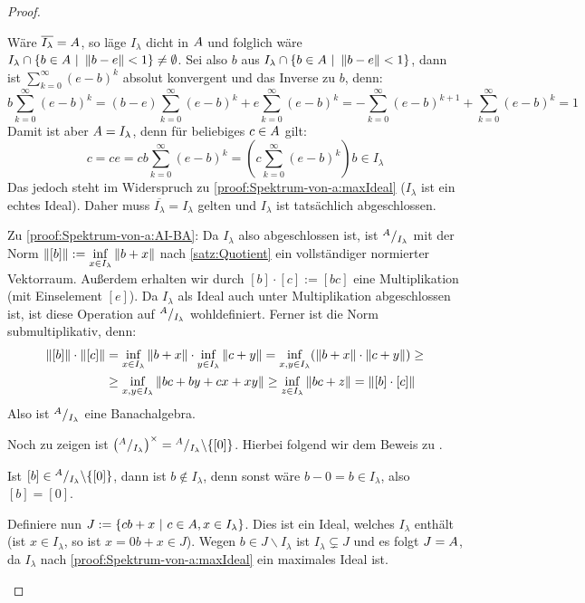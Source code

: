 \begin{proof}
\begin{itemize}
Wäre $\overline{I_\lambda} = A$, so läge $I_\lambda$ dicht in $A$ und folglich wäre $I_\lambda \cap \{b \in A ~|~ \left\lVert b-e\right\rVert < 1\} \neq \emptyset$. Sei also $b$ aus $I_\lambda \cap \{b \in A ~|~ \left\lVert b-e\right\rVert < 1\}$, dann ist $\sum_{k=0}^\infty(e-b)^k$ absolut konvergent und das Inverse zu $b$, denn:
	\[b\sum_{k=0}^\infty(e-b)^k = (b-e)\sum_{k=0}^\infty(e-b)^k + e\sum_{k=0}^\infty(e-b)^k = -\sum_{k=0}^\infty(e-b)^{k+1} +\sum_{k=0}^\infty(e-b)^k = 1\]
Damit ist aber $A = I_\lambda$, denn für beliebiges $c \in A$ gilt:
	\[c = ce = cb\sum_{k=0}^\infty(e-b)^k = \left(c\sum_{k=0}^\infty(e-b)^k\right) b \in I_\lambda\]
Das jedoch steht im Widerspruch zu \ref{proof:Spektrum-von-a:maxIdeal} ($I_\lambda$ ist ein echtes Ideal). Daher muss $\overline{I_\lambda} = I_\lambda$ gelten und $I_\lambda$ ist tatsächlich abgeschlossen.


Zu \ref{proof:Spektrum-von-a:AI-BA}:
Da $I_\lambda$ also abgeschlossen ist, ist $^A/_{I_\lambda}$ mit der Norm $\left\lVert[b]\right\rVert := \underset{x \in I_\lambda}{\inf}\left\lVert b+x\right\rVert$ nach \cref{satz:Quotient} ein vollständiger normierter Vektorraum. Außerdem erhalten wir durch $[b]\cdot [c] := [bc]$ eine Multiplikation (mit Einselement $[e]$). Da $I_\lambda$ als Ideal auch unter Multiplikation abgeschlossen ist, ist diese Operation auf $^A/_{I_\lambda}$ wohldefiniert. Ferner ist die Norm submultiplikativ, denn:
	\begin{align*}
		\left\lVert[b]\right\rVert \cdot \left\lVert[c]\right\rVert &= \underset{x \in I_\lambda}{\inf}\left\lVert b+x\right\rVert \cdot \underset{y \in I_\lambda}{\inf}\left\lVert c+y\right\rVert = \underset{x,y \in I_\lambda}{\inf}(\left\lVert b+x\right\rVert \cdot \left\lVert c+y\right\rVert) \geq \\
		&\geq \underset{x,y \in I_\lambda}{\inf}\left\lVert bc+by+cx+xy\right\rVert \geq \underset{z \in I_\lambda}{\inf}\left\lVert bc+z\right\rVert = \left\lVert[b]\cdot[c]\right\rVert
	\end{align*}
Also ist $^A/_{I_\lambda}$ eine Banachalgebra.

Noch zu zeigen ist $\left({}^A/_{I_\lambda}\right)^\times = {}^A/_{I_\lambda} \backslash \{[0]\}$. Hierbei folgend wir dem Beweis zu \cite[Lemma IX.2.5(e)]{Werner2011}.

Ist $[b] \in {}^A/_{I_\lambda} \backslash \{[0]\}$, dann ist $b \notin I_\lambda$, denn sonst wäre $b-0 = b \in I_\lambda$, also $[b] = [0]$.

Definiere nun $J := \{cb + x ~|~ c\in A, x\in I_\lambda\}$. Dies ist ein Ideal, welches $I_\lambda$ enthält (ist $x \in I_\lambda$, so ist $x = 0b+x \in J$). Wegen $b \in J \backslash I_\lambda$ ist $I_\lambda \subsetneq J$ und es folgt $J = A$, da $I_\lambda$ nach \ref{proof:Spektrum-von-a:maxIdeal} ein maximales Ideal ist.


\end{itemize}
\end{proof}
